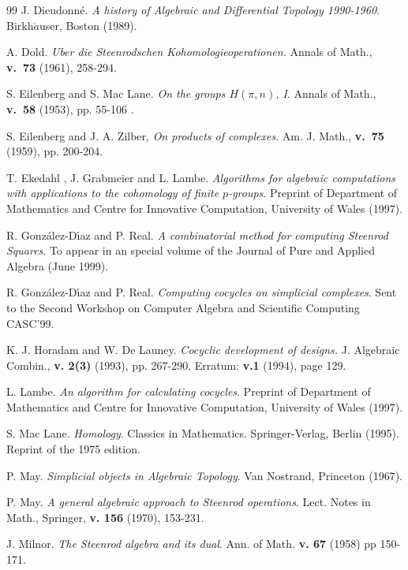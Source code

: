 \begin{thebibliography}{99}
 J. Dieudonn\'{e}. {\it A history
of Algebraic and Differential Topology 1990-1960}.
Birkh$\ddot{a}$user, Boston (1989).

 A. Dold. {\em Uber die Steenrodschen
Kohomologieoperationen.} Annals of Math., \mbox{\bf v. 73}
(1961), 258-294.

 S.  Eilenberg   and S. Mac
Lane. {\em On the groups $H(\pi,n)$, I}. Annals of Math., \mbox{\bf v.
 58} (1953), pp. 55-106 .

 S. Eilenberg and J. A. Zilber, {\em On
products of complexes}. Am. J. Math., \mbox{\bf v. 75} (1959), pp. 200-204.

 T. Ekedahl , J. Grabmeier and L. Lambe.
{\em Algorithms for algebraic computations with
applications to the cohomology of finite $p$-groups}.
Preprint of Department of
Mathematics and Centre for Innovative Computation,
University of Wales (1997).

 R. Gonz\'{a}lez-D\'{\i}az and P. Real. {\it A combinatorial
method for computing Steenrod Squares}. To appear in an special volume of the
Journal of Pure and Applied Algebra (June 1999).

 R. Gonz\'{a}lez-D\'{\i}az and P. Real. {\it Computing
cocycles on simplicial complexes}. Sent to the Second Workshop
on Computer Algebra and Scientific Computing CASC'99.

 K. J. Horadam and W. De Launey. {\it Cocyclic
development of designs.} J. Algebraic Combin., {\bf v. 2(3)} (1993), pp. 267-290.
Erratum: {\bf v.1} (1994), page 129.

 L. Lambe. {\em An algorithm for
calculating cocycles}.
Preprint of Department of
Mathematics and Centre for Innovative Computation,
University of Wales (1997).

 S. Mac Lane. {\em Homology}. Classics in
Mathematics. Springer-Verlag, Berlin (1995). Reprint of the 1975
edition.

 P. May. {\em Simplicial objects in
Algebraic Topology}. Van Nostrand, Princeton (1967).

 P. May. {\em A general algebraic
approach to Steenrod operations}.
Lect. Notes in Math., Springer, {\bf v.    156}
(1970), 153-231.

 J. Milnor. {\em The Steenrod algebra and its
dual}. Ann. of Math. {\bf v. 67} (1958) pp 150-171.


\end{thebibliography}
